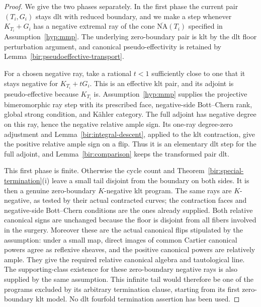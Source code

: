 \documentclass[11pt,letterpaper]{article}
\theoremstyle{definition}
\theoremstyle{remark}
\begin{document}
\begin{proof}
We give the two phases separately.  In the first phase the current
pair $(T_i,G_i)$ stays dlt with reduced boundary, and we make a step
whenever $K_{T_i}+G_i$ has a negative extremal ray of the cone
$\overline{\mathrm{NA}}(T_i)$ specified in Assumption~\ref{hyp:mmp}.
The underlying zero-boundary pair is klt by the dlt floor
perturbation argument, and canonical pseudo-effectivity is retained
by Lemma~\ref{bir:pseudoeffective-transport}.

For a chosen negative ray, take a rational $t<1$ sufficiently close
to one that it stays negative for $K_{T_i}+tG_i$.  This is an
effective klt pair, and its adjoint is pseudo-effective because
$K_{T_i}$ is.  Assumption~\ref{hyp:mmp} supplies the projective
bimeromorphic ray step with its prescribed face, negative-side
Bott--Chern rank, global strong condition, and K\"ahler category.
The full adjoint has negative degree on this ray, hence the negative
relative ample sign.  Its one-ray degree-zero adjustment and
Lemma~\ref{bir:integral-descent}, applied to the klt contraction,
give the positive relative ample sign on a flip.  Thus it is an
elementary dlt step for the full adjoint, and
Lemma~\ref{bir:comparison} keeps the transformed pair dlt.

This first phase is finite.  Otherwise the cycle count and
Theorem~\ref{bir:special-termination}(i) leave a small tail disjoint
from the boundary on both sides.  It is then a genuine
zero-boundary $K$-negative klt program.  The same rays are
$K$-negative, as tested by their actual contracted curves; the
contraction faces and negative-side Bott--Chern conditions are the
ones already supplied.  Both relative canonical signs are unchanged
because the floor is disjoint from all fibers involved in the
surgery.  Moreover these are the actual canonical flips stipulated
by the assumption: under a small map, direct images of common
Cartier canonical powers agree as reflexive sheaves, and the
positive canonical powers are relatively ample.  They give the
required relative canonical algebra and tautological line.  The
supporting-class existence for these zero-boundary negative rays
is also supplied by the same assumption.  This infinite tail would
therefore be one of the programs excluded by its arbitrary
termination clause, starting from its first zero-boundary klt
model.  No dlt fourfold termination assertion has been used.


\end{proof}
\end{document}

